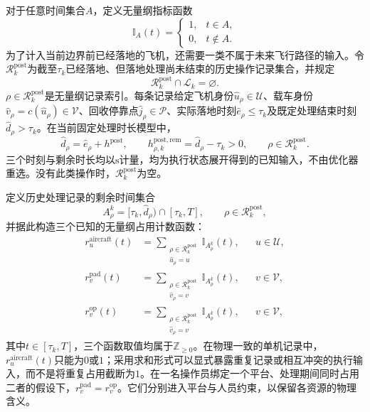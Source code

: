 对于任意时间集合$A$，定义无量纲指标函数
\begin{equation}
 \mathbb I_A(t)=
 \begin{cases}
 1,&t\in A,\\
 0,&t\notin A.
 \end{cases}
 \label{s0504:interval_indicator}
\end{equation}
为了计入当前边界前已经落地的飞机，还需要一类不属于未来飞行路径的输入。令$\mathcal R_k^{\mathrm{post}}$为截至$\tau_k$已经落地、但落地处理尚未结束的历史操作记录集合，并规定
\begin{equation}
 \mathcal R_k^{\mathrm{post}}\cap\mathcal L_k=\varnothing.
 \label{s0504:residual_disjointness}
\end{equation}
$\rho\in\mathcal R_k^{\mathrm{post}}$是无量纲记录索引。每条记录给定飞机身份$\widehat u_\rho\in\mathcal U$、载车身份$\widehat v_\rho=c(\widehat u_\rho)\in\mathcal V$、回收停靠点$\widehat j_\rho\in\mathcal P$、实际落地时刻$\widehat e_\rho\le\tau_k$及既定处理结束时刻$\widehat d_\rho>\tau_k$。在当前固定处理时长模型中，
\begin{equation}
 \widehat d_\rho=\widehat e_\rho+h^{\mathrm{post}},
 \qquad
 h_{\rho,k}^{\mathrm{post,rem}}
 =\widehat d_\rho-\tau_k>0,
 \qquad\rho\in\mathcal R_k^{\mathrm{post}}.
 \label{s0504:remaining_recovery_duration}
\end{equation}
三个时刻与剩余时长均以$\mathrm{s}$计量，均为执行状态展开得到的已知输入，不由优化器重选。没有此类操作时，$\mathcal R_k^{\mathrm{post}}$为空。

定义历史处理记录的剩余时间集合
\begin{equation}
 A_\rho^k=[\tau_k,\widehat d_\rho)\cap[\tau_k,T],
 \qquad\rho\in\mathcal R_k^{\mathrm{post}},
 \label{s0504:historical_residual_interval}
\end{equation}
并据此构造三个已知的无量纲占用计数函数：
\begin{align}
 r_u^{\mathrm{aircraft}}(t)
 &=\sum_{\substack{\rho\in\mathcal R_k^{\mathrm{post}}\\
                    \widehat u_\rho=u}}
       \mathbb I_{A_\rho^k}(t),
 &&u\in\mathcal U,
 \label{s0504:residual_aircraft_indicator}\\
 r_v^{\mathrm{pad}}(t)
 &=\sum_{\substack{\rho\in\mathcal R_k^{\mathrm{post}}\\
                    \widehat v_\rho=v}}
       \mathbb I_{A_\rho^k}(t),
 &&v\in\mathcal V,
 \label{s0504:residual_pad_indicator}\\
 r_v^{\mathrm{op}}(t)
 &=\sum_{\substack{\rho\in\mathcal R_k^{\mathrm{post}}\\
                    \widehat v_\rho=v}}
       \mathbb I_{A_\rho^k}(t),
 &&v\in\mathcal V,
 \label{s0504:residual_operator_indicator}
\end{align}
其中$t\in[\tau_k,T]$，三个函数取值均属于$\mathbb Z_{\ge0}$。在物理一致的单机记录中，$r_u^{\mathrm{aircraft}}(t)$只能为$0$或$1$；采用求和形式可以显式暴露重复记录或相互冲突的执行输入，而不是将重复占用截断为$1$。在一名操作员绑定一个平台、处理期间同时占用二者的假设下，$r_v^{\mathrm{pad}}=r_v^{\mathrm{op}}$。它们分别进入平台与人员约束，以保留各资源的物理含义。

